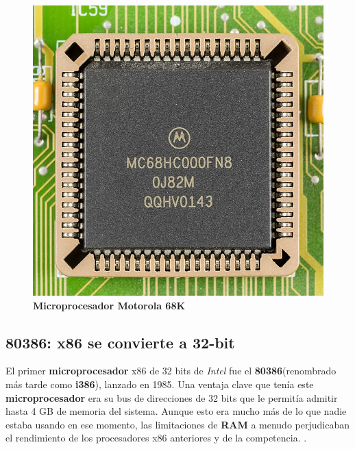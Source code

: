 \begin{figure}[htb]
	\centering
	\includegraphics[scale = 0.15]{Graphics/Motorola_MC68HC000FN8-0695.jpg}
	\caption{\textbf{Microprocesador Motorola 68K}}
	\label{fig:17}
\end{figure}

\subsection{80386: x86 se convierte a 32-bit}
El primer \textbf{microprocesador} x86 de 32 bits de \emph{Intel} fue el \textbf{80386}(renombrado más tarde como \textbf{i386}), lanzado en 1985. Una ventaja clave que 
tenía este \textbf{microprocesador} era su bus de direcciones de 32 bits que le permitía admitir hasta 4 GB de memoria del sistema. Aunque esto era mucho 
más de lo que nadie estaba usando en ese momento, las limitaciones de \textbf{RAM} a menudo perjudicaban el rendimiento de los procesadores x86 anteriores y de la competencia. 
.

